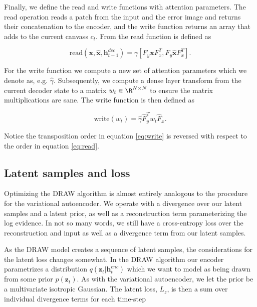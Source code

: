 Finally, we define the read and write functions with attention parameters. The read operation reads a patch from the input and the error image and returns their concatenation to the encoder, and the write function returns an array that adds to the current canvass $c_t$. From \citet{Gregor2015} the read function is defined as

\begin{equation}\label{eq:read}
\text{read}(\mathbf{x}, \mathbf{\hat{x}}, \mathbf{h}_{t-1}^{dec}) = \gamma[F_y \mathbf{x} F_x^T, F_y \mathbf{\hat{x}} F_x^T].
\end{equation} 

\noindent For the write function we compute a new set of attention parameters which we denote as, e.g. $\hat{\gamma}$. Subsequently, we compute a dense layer transform from the current decoder state to a matrix $w_t \in \R^{N \times N}$ to ensure the matrix multiplications are sane. The write function is then defined as

\begin{equation}\label{eq:write}
\text{write}(w_t)  = \hat{\gamma} \hat{F}^T_y w_t \hat{F}_x.
\end{equation}

\noindent Notice the transposition order in equation \ref{eq:write} is reversed with respect to the order in equation \ref{eq:read}. 

\subsection{Latent samples and loss}

Optimizing the DRAW algorithm is almost entirely analogous to the procedure for the variational autoencoder. We operate with a divergence over our latent samples and a latent prior, as well as a reconstruction term parameterizing the log evidence. In not so many words, we still have a cross-entropy loss over the reconstruction and input as well as a divergence term from our latent samples.  

As the DRAW model creates a sequence of latent samples, the considerations for the latent loss changes somewhat. In the DRAW algorithm our encoder parametrizes a distribution $q(\mathbf{z}_t | \mathbf{h}_t^{enc})$ which we want to model as being drawn from some prior $p(\mathbf{z}_t)$. As with the variational autoencoder, we let the prior be a multivariate isotropic Gaussian. The latent loss, $L_z$, is then a sum over individual divergence terms for each time-step

